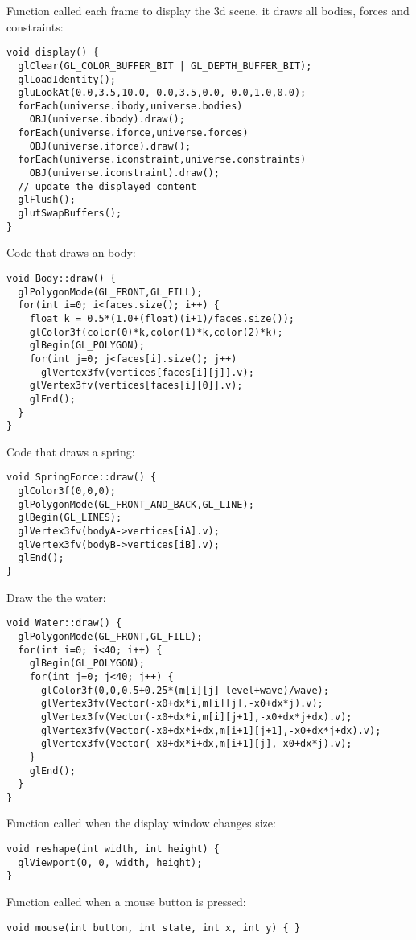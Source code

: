 \noindent
Function called each frame to display the 3d scene.
it draws all bodies, forces and constraints: \begin{lstlisting}
void display() {
  glClear(GL_COLOR_BUFFER_BIT | GL_DEPTH_BUFFER_BIT);
  glLoadIdentity();
  gluLookAt(0.0,3.5,10.0, 0.0,3.5,0.0, 0.0,1.0,0.0);
  forEach(universe.ibody,universe.bodies)
    OBJ(universe.ibody).draw();
  forEach(universe.iforce,universe.forces)
    OBJ(universe.iforce).draw();
  forEach(universe.iconstraint,universe.constraints)
    OBJ(universe.iconstraint).draw();
  // update the displayed content
  glFlush();
  glutSwapBuffers();
}
\end{lstlisting}
\noindent
Code that draws an body: \begin{lstlisting}
void Body::draw() {
  glPolygonMode(GL_FRONT,GL_FILL);
  for(int i=0; i<faces.size(); i++) {      
    float k = 0.5*(1.0+(float)(i+1)/faces.size());
    glColor3f(color(0)*k,color(1)*k,color(2)*k);    
    glBegin(GL_POLYGON);        
    for(int j=0; j<faces[i].size(); j++)
      glVertex3fv(vertices[faces[i][j]].v);
    glVertex3fv(vertices[faces[i][0]].v);
    glEnd();
  }
}
\end{lstlisting}
\noindent
Code that draws a spring: \begin{lstlisting}
void SpringForce::draw() {
  glColor3f(0,0,0);
  glPolygonMode(GL_FRONT_AND_BACK,GL_LINE);
  glBegin(GL_LINES);
  glVertex3fv(bodyA->vertices[iA].v);
  glVertex3fv(bodyB->vertices[iB].v);
  glEnd();
}
\end{lstlisting}
\noindent
Draw the the water: \begin{lstlisting}
void Water::draw() {
  glPolygonMode(GL_FRONT,GL_FILL);
  for(int i=0; i<40; i++) {
    glBegin(GL_POLYGON);
    for(int j=0; j<40; j++) {
      glColor3f(0,0,0.5+0.25*(m[i][j]-level+wave)/wave);
      glVertex3fv(Vector(-x0+dx*i,m[i][j],-x0+dx*j).v);
      glVertex3fv(Vector(-x0+dx*i,m[i][j+1],-x0+dx*j+dx).v);
      glVertex3fv(Vector(-x0+dx*i+dx,m[i+1][j+1],-x0+dx*j+dx).v);
      glVertex3fv(Vector(-x0+dx*i+dx,m[i+1][j],-x0+dx*j).v);
    }
    glEnd();
  }      
}
\end{lstlisting}
\noindent
Function called when the display window changes size: \begin{lstlisting}
void reshape(int width, int height) {
  glViewport(0, 0, width, height);
}
\end{lstlisting}
\noindent
Function called when a mouse button is pressed: \begin{lstlisting}
void mouse(int button, int state, int x, int y) { }
\end{lstlisting}
